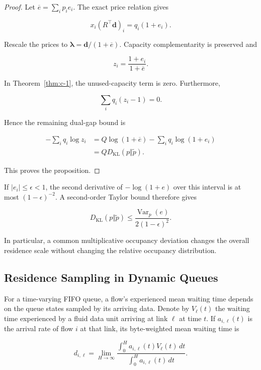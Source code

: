 \begin{proof} Let \(\overline e=\sum_ip_ie_i\). The exact price relation gives

\[
x_i(R^\top\mathbf d)_i=q_i(1+e_i).
\]

Rescale the prices to \(\boldsymbol\lambda=\mathbf d/(1+\overline e)\). Capacity complementarity is preserved and

\[
z_i=\frac{1+e_i}{1+\overline e}.
\]

In Theorem~\ref{thm:c-1}, the unused-capacity term is zero. Furthermore,

\[
\sum_iq_i(z_i-1)=0.
\]

Hence the remaining dual-gap bound is

\[
\begin{aligned}
-\sum_iq_i\log z_i
&=Q\log(1+\overline e)-\sum_iq_i\log(1+e_i)\\
&=QD_{\mathrm{KL}}(p\Vert\widetilde p).
\end{aligned}
\]

This proves the proposition.
\end{proof}

If \(|e_i|\le\epsilon<1\), the second derivative of \(-\log(1+e)\) over this interval is at most \((1-\epsilon)^{-2}\). A second-order Taylor bound therefore gives

\begin{equation}
\label{eq:app-c-21}
D_{\mathrm{KL}}(p\Vert\widetilde p)
\le
\frac{\operatorname{Var}_p(e)}
{2(1-\epsilon)^2}.
\end{equation}

In particular, a common multiplicative occupancy deviation changes the overall residence scale without changing the relative occupancy distribution.

\subsection{Residence Sampling in Dynamic Queues}
\label{app:c-5}

For a time-varying FIFO queue, a flow's experienced mean waiting time depends on the queue states sampled by its arriving data. Denote by \(V_\ell(t)\) the waiting time experienced by a fluid data unit arriving at link \(\ell\) at time \(t\). If \(a_{i,\ell}(t)\) is the arrival rate of flow \(i\) at that link, its byte-weighted mean waiting time is

\begin{equation}
\label{eq:app-c-22}
d_{i,\ell}
=
\lim_{H\to\infty}
\frac{\int_0^H a_{i,\ell}(t)V_\ell(t)\,dt}
{\int_0^H a_{i,\ell}(t)\,dt}.
\end{equation}

